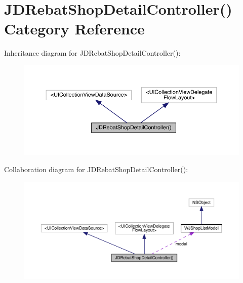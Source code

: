 \hypertarget{category_j_d_rebat_shop_detail_controller_07_08}{}\section{J\+D\+Rebat\+Shop\+Detail\+Controller() Category Reference}
\label{category_j_d_rebat_shop_detail_controller_07_08}


Inheritance diagram for J\+D\+Rebat\+Shop\+Detail\+Controller()\+:\nopagebreak
\begin{figure}[H]
\begin{center}
\leavevmode
\includegraphics[width=350pt]{category_j_d_rebat_shop_detail_controller_07_08__inherit__graph}
\end{center}
\end{figure}


Collaboration diagram for J\+D\+Rebat\+Shop\+Detail\+Controller()\+:\nopagebreak
\begin{figure}[H]
\begin{center}
\leavevmode
\includegraphics[width=350pt]{category_j_d_rebat_shop_detail_controller_07_08__coll__graph}
\end{center}
\end{figure}
